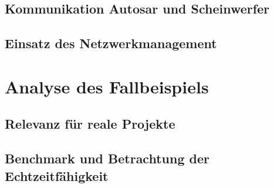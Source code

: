 \documentclass[
  a4paper,					    %
  twoside,
  DIV=calc,     				%
  bibliography=totoc,
  cleardoublepage=empty,
  ngerman,     					%
  final       					%
]{scrbook}
\begin{document}
\section{Kommunikation Autosar und Scheinwerfer}
\label{sec:Kommunikation_A_S}




\section{Einsatz des Netzwerkmanagement}
\label{sec:AutosarNM}








\chapter{Analyse des Fallbeispiels}
\label{sec:Beispiel_Analyse}




\section{Relevanz für reale Projekte}
\label{sec:Relevanz}
% 



% 
\section{Benchmark und Betrachtung der Echtzeitfähigkeit}
\label{sec:Benchmark}
%
%
\end{document}
